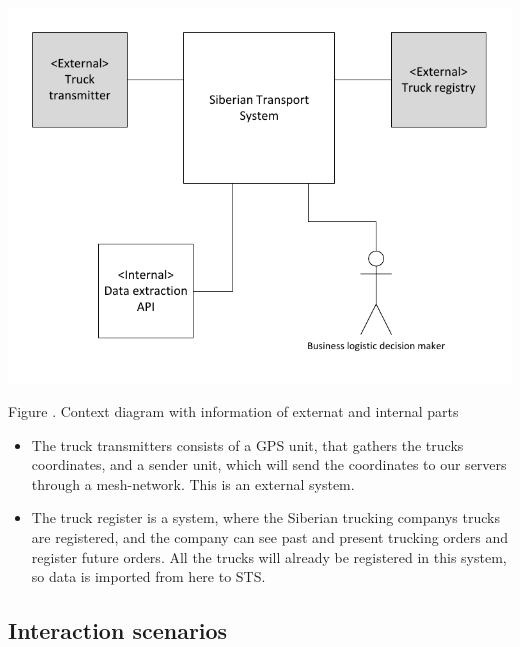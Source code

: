 \documentclass[a4paper,11pt]{report}
\newcommand{\mycaption}[1]{
  \addtocounter{figures}{1}
  Figure \arabic{figures}. #1
}
\begin{document}
\begin{center}
  \includegraphics[width=\textwidth]{figures/sts_formal_context_diagram}\\
\end{center}
  \mycaption{Context diagram with information of externat and internal parts }

\begin{itemize}
\item The truck transmitters consists of a GPS unit, that gathers the trucks coordinates, and a sender unit, which will send the coordinates to our servers through a mesh-network. This is an external system.
\item The truck register is a system, where the Siberian trucking companys trucks are registered, and the company can see past and present trucking orders and register future orders. All the trucks will already be registered in this system, so data is imported from here to STS. 
\end{itemize}


\subsection{Interaction scenarios}
\label{sec:inter-scen}
\end{document}
